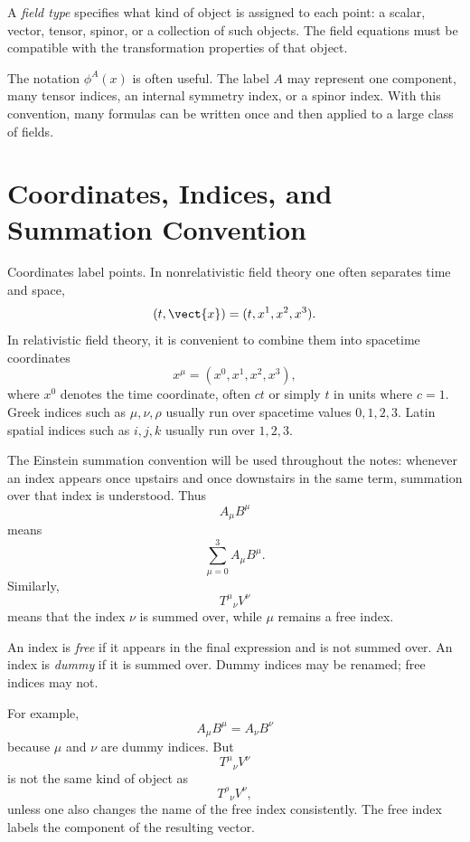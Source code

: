 \begin{definitionbox}
A \emph{field type} specifies what kind of object is assigned to each point:
a scalar, vector, tensor, spinor, or a collection of such objects. The field
equations must be compatible with the transformation properties of that object.
\end{definitionbox}

The notation \(\phi^A(x)\) is often useful. The label \(A\) may represent one
component, many tensor indices, an internal symmetry index, or a spinor index.
With this convention, many formulas can be written once and then applied to a
large class of fields.

\section{Coordinates, Indices, and Summation Convention}

Coordinates label points. In nonrelativistic field theory one often separates
time and space,
\[
    (t,\vect{x}) = (t,x^1,x^2,x^3).
\]
In relativistic field theory, it is convenient to combine them into spacetime
coordinates
\[
    x^\mu = (x^0,x^1,x^2,x^3),
\]
where \(x^0\) denotes the time coordinate, often \(ct\) or simply \(t\) in units
where \(c=1\). Greek indices such as \(\mu,\nu,\rho\) usually run over spacetime
values \(0,1,2,3\). Latin spatial indices such as \(i,j,k\) usually run over
\(1,2,3\).

The Einstein summation convention will be used throughout the notes: whenever
an index appears once upstairs and once downstairs in the same term, summation
over that index is understood. Thus
\[
    A_\mu B^\mu
\]
means
\[
    \sum_{\mu=0}^{3} A_\mu B^\mu.
\]
Similarly,
\[
    T^\mu{}_{\nu}V^\nu
\]
means that the index \(\nu\) is summed over, while \(\mu\) remains a free index.

\begin{definitionbox}
An index is \emph{free} if it appears in the final expression and is not summed
over. An index is \emph{dummy} if it is summed over. Dummy indices may be renamed;
free indices may not.
\end{definitionbox}

For example,
\[
    A_\mu B^\mu = A_\nu B^\nu
\]
because \(\mu\) and \(\nu\) are dummy indices. But
\[
    T^\mu{}_{\nu}V^\nu
\]
is not the same kind of object as
\[
    T^\rho{}_{\nu}V^\nu,
\]
unless one also changes the name of the free index consistently. The free index
labels the component of the resulting vector.

